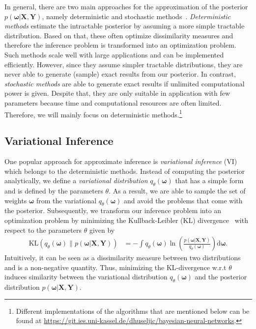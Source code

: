 \documentclass[runningheads]{llncs}
\begin{document}
In general, there are two main approaches for the approximation of the posterior $p\left(\boldsymbol{\omega} | \mathbf{X}, \mathbf{Y} \right)$, namely deterministic and stochastic methods~\cite{bishop:2006:PRML}.
\textit{Deterministic methods} estimate the intractable posterior by assuming a more simple tractable distribution.
Based on that, these often optimize dissimilarity measures and therefore the inference problem is transformed into an optimization problem.
Such methods scale well with large applications and can be implemented efficiently.
However, since they assume simpler tractable distributions, they are never able to generate (sample) exact results from our posterior.
In contrast, \textit{stochastic methods} are able to generate exact results if unlimited computational power is given.
Despite that, they are only suitable in application with few parameters because time and computational resources are often limited.
Therefore, we will mainly focus on deterministic methods.\footnote{Different implementations of the algorithms that are mentioned below can be found at \url{https://git.ies.uni-kassel.de/dhuseljic/bayesian-neural-networks}.}

\subsection{Variational Inference}
\label{sec:variational_inference}
One popular approach for approximate inference is \textit{variational inference} (VI)~\cite{blei2017variational} which belongs to the deterministic methods.
Instead of computing the posterior analytically, we define a \textit{variational distribution} $q_\theta(\boldsymbol{\omega})$ that has a simple form and is defined by the parameters $\theta$.
As a result, we are able to sample the set of weights $\boldsymbol{\omega}$ from the variational $q_\theta(\boldsymbol{\omega})$ and avoid the problems that come with the posterior.
Subsequently, we transform our inference problem into an optimization problem by minimizing the Kullback-Leibler (KL) divergence~\cite{Kullback51klDivergence} with respect to the parameters $\theta$ given by
\begin{align}
    \text{KL}\left( q_\theta(\boldsymbol{\omega}) \| p(\boldsymbol{\omega} | \mathbf{X}, \mathbf{Y})\right) &= - \int q_{\theta}(\boldsymbol{\omega}) \ln \left(\frac{p(\boldsymbol{\omega} | \mathbf{X}, \mathbf{Y})}{q_{\theta}(\boldsymbol{\omega})}\right) \text{d}\boldsymbol{\omega}.\label{eq:kl_divergence}
\end{align}
Intuitively, it can be seen as a dissimilarity measure between two distributions and is a non-negative quantity. Thus, minimizing the KL-divergence w.r.t $\theta$ induces similarity between the variational distribution $q_\theta(\boldsymbol{\omega})$ and the posterior distribution $p(\boldsymbol{\omega} | \mathbf{X}, \mathbf{Y})$.
\end{document}
